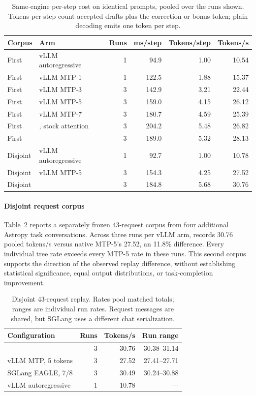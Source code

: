 \begin{table}[t]
\caption{Same-engine per-step cost on identical prompts, pooled over the runs shown. Tokens per step count accepted drafts plus the correction or bonus token; plain decoding emits one token per step.}
\label{tab:per-step}
\centering\footnotesize
\setlength{\tabcolsep}{2.5pt}
\begin{tabular}{@{}llrrrr@{}}
\toprule
Corpus & Arm & Runs & ms/step & Tokens/step & Tokens/s \\
\midrule
First & vLLM autoregressive & 1 & 94.9 & 1.00 & 10.54 \\
First & vLLM MTP-1 & 1 & 122.5 & 1.88 & 15.37 \\
First & vLLM MTP-3 & 3 & 142.9 & 3.21 & 22.44 \\
First & vLLM MTP-5 & 3 & 159.0 & 4.15 & 26.12 \\
First & vLLM MTP-7 & 3 & 180.7 & 4.59 & 25.39 \\
First & \sys{}, stock attention & 3 & 204.2 & 5.48 & 26.82 \\
First & \sys{} & 3 & 189.0 & 5.32 & 28.13 \\
Disjoint & vLLM autoregressive & 1 & 92.7 & 1.00 & 10.78 \\
Disjoint & vLLM MTP-5 & 3 & 154.3 & 4.25 & 27.52 \\
Disjoint & \sys{} & 3 & 184.8 & 5.68 & 30.76 \\
\bottomrule
\end{tabular}
\end{table}

\paragraph{Disjoint request corpus}
Table~\ref{tab:disjoint-replay} reports a separately frozen 43-request corpus from four additional Astropy task conversations. Across three runs per vLLM arm, \sys{} records 30.76 pooled tokens/s versus native MTP-5's 27.52, an 11.8\% difference. Every individual tree rate exceeds every MTP-5 rate in these runs. This second corpus supports the direction of the observed replay difference, without establishing statistical significance, equal output distributions, or task-completion improvement.

\begin{table}[t]
\caption{Disjoint 43-request replay. Rates pool matched totals; ranges are individual run rates. Request messages are shared, but SGLang uses a different chat serialization.}
\label{tab:disjoint-replay}
\centering\small
\begin{tabular}{@{}lrrr@{}}
\toprule
Configuration & Runs & Tokens/s & Run range \\
\midrule
\sys{} & 3 & 30.76 & 30.38--31.14 \\
vLLM MTP, 5 tokens & 3 & 27.52 & 27.41--27.71 \\
SGLang EAGLE, 7/8 & 3 & 30.49 & 30.24--30.88 \\
vLLM autoregressive & 1 & 10.78 & --- \\
\bottomrule
\end{tabular}
\end{table}

